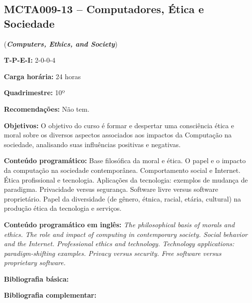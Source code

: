 \documentclass[class=article, crop=false]{standalone}
\begin{document}
\subsection*{MCTA009-13 -- Computadores, Ética e Sociedade}
\label{disc:ces}

(\textbf{\textit{Computers, Ethics, and Society}})

\begin{center}
    \begin{minipage}{0.85\textwidth}
        \textbf{T-P-E-I:} 2-0-0-4
        
        \textbf{Carga horária:} 24 horas
        
        \textbf{Quadrimestre:} 10º
        
        \textbf{Recomendações:} Não tem.
    \end{minipage}
\end{center}

\textbf{Objetivos:}
O objetivo do curso é formar e despertar uma consciência ética e moral sobre os
diversos aspectos associados aos impactos da Computação na sociedade,
analisando suas influências positivas e negativas.

\textbf{Conteúdo programático:}
Base filosófica da moral e ética.
O papel e o impacto da computação na sociedade contemporânea.
Comportamento social e Internet.
Ética profissional e tecnologia.
Aplicações da tecnologia: exemplos de mudança de paradigma.
Privacidade versus segurança.
Software livre versus software proprietário.
Papel da diversidade (de gênero, étnica, racial, etária, cultural) na produção ética da tecnologia e serviços.

\textbf{Conteúdo programático em inglês:}
\textit{The philosophical basis of morals and ethics.
The role and impact of computing in contemporary society. 
Social behavior and the Internet. 
Professional ethics and technology. 
Technology applications: paradigm-shifting examples. 
Privacy versus security. 
Free software versus proprietary software.}

\newrefsection
\textbf{Bibliografia básica:}
\nocite{2017-vazquez, 2020-maciel-viterboa, 2020-maciel-viterbob,2020-maciel-viterboc} 
\printbibliography

\newrefsection
\textbf{Bibliografia complementar:}
\nocite{2011-dupas, 2008-masiero, 2004-lessig, 2010-levy}
\printbibliography
\end{document}
